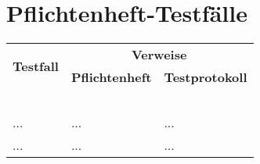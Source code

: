 %



\newpage



\section{Pflichtenheft-Testfälle}
\label{Abschnitt:Tests:Protokoll:Pflichtenheft-Verweise}


\begin{longtable}{p{0.5\hsize}p{0.25\hsize}p{0.25\hsize}}


	    \multirow{2}{*}{\textbf{Testfall}}
	  & \multicolumn{2}{c}{\textbf{Verweise}}
	  
	  \\ [14pt]
	  
	  & {\centering \textbf{Pflichtenheft}}
	  & {\centering \textbf{Testprotokoll}}
	  
	  \\
	  
	     ~ & ~ & ~
	  
	  \\


	  ...
	& {\centering ...}
	& {\centering ...}
	
	\\
	
	  ...
	& {\centering ...}
	& {\centering ...}
	
	\\
	

\end{longtable}




